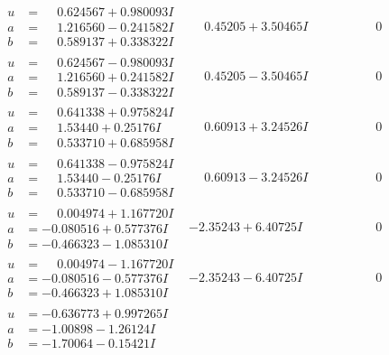 \documentclass[1p]{elsarticle_modified}
\theoremstyle{definition}
\begin{document}
$$\begin{array}{c|c|c}
\begin{aligned}
u &= \phantom{-}0.624567 + 0.980093 I \\
a &= \phantom{-}1.216560 - 0.241582 I \\
b &= \phantom{-}0.589137 + 0.338322 I\end{aligned}
 & \phantom{-}0.45205 + 3.50465 I & \phantom{-0.000000 } 0 \\ \hline\begin{aligned}
u &= \phantom{-}0.624567 - 0.980093 I \\
a &= \phantom{-}1.216560 + 0.241582 I \\
b &= \phantom{-}0.589137 - 0.338322 I\end{aligned}
 & \phantom{-}0.45205 - 3.50465 I & \phantom{-0.000000 } 0 \\ \hline\begin{aligned}
u &= \phantom{-}0.641338 + 0.975824 I \\
a &= \phantom{-}1.53440 + 0.25176 I \\
b &= \phantom{-}0.533710 + 0.685958 I\end{aligned}
 & \phantom{-}0.60913 + 3.24526 I & \phantom{-0.000000 } 0 \\ \hline\begin{aligned}
u &= \phantom{-}0.641338 - 0.975824 I \\
a &= \phantom{-}1.53440 - 0.25176 I \\
b &= \phantom{-}0.533710 - 0.685958 I\end{aligned}
 & \phantom{-}0.60913 - 3.24526 I & \phantom{-0.000000 } 0 \\ \hline\begin{aligned}
u &= \phantom{-}0.004974 + 1.167720 I \\
a &= -0.080516 + 0.577376 I \\
b &= -0.466323 - 1.085310 I\end{aligned}
 & -2.35243 + 6.40725 I & \phantom{-0.000000 } 0 \\ \hline\begin{aligned}
u &= \phantom{-}0.004974 - 1.167720 I \\
a &= -0.080516 - 0.577376 I \\
b &= -0.466323 + 1.085310 I\end{aligned}
 & -2.35243 - 6.40725 I & \phantom{-0.000000 } 0 \\ \hline\begin{aligned}
u &= -0.636773 + 0.997265 I \\
a &= -1.00898 - 1.26124 I \\
b &= -1.70064 - 0.15421 I\end{aligned}

\end{array}$$
\end{document}
